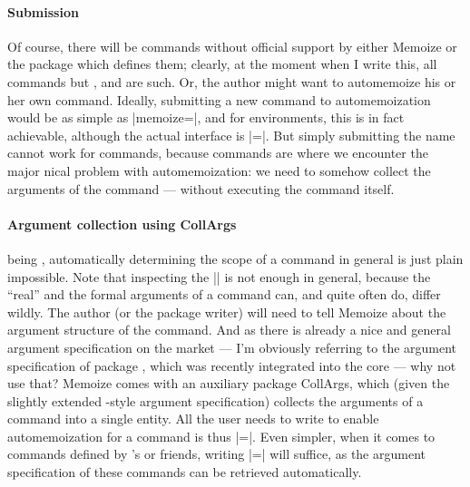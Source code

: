 \documentclass[a4paper,11pt]{article}
\begin{document}
\paragraph{Submission}
Of course, there will be commands without official support by either Memoize or
the package which defines them; clearly, at the moment when I write this, all
commands but ,  and  are such.  Or, the
author might want to automemoize his or her own command.  Ideally, submitting a
new command to automemoization would be as simple as
|memoize=|{}, and for environments, this is in fact achievable,
although the actual interface is
|=|.  But
simply submitting the name cannot work for commands, because commands are where
we encounter the major nical problem with automemoization: we need
to somehow collect the arguments of the command --- without executing the
command itself.

\paragraph{Argument collection using CollArgs}
 being , automatically determining the scope of a
command in general is just plain impossible.  Note that inspecting the
|\meaning| is not enough in general, because the ``real'' and the formal
arguments of a command can, and quite often do, differ wildly.  The author (or the
package writer) will need to tell Memoize about the argument structure of the
command.  And as there is already a nice and general argument specification on
the market --- I'm obviously referring to the argument specification of package
, which was recently integrated into the core 
--- why not use that?  Memoize comes with an auxiliary package CollArgs, which
(given the slightly extended -style argument specification)
collects the arguments of a command into a single entity.  All the user needs
to write to enable automemoization for a command is thus
|=|.  Even simpler,
when it comes to commands defined by 's 
or friends, writing |=|
will suffice, as the argument specification of these commands can be retrieved
automatically.
\end{document}
